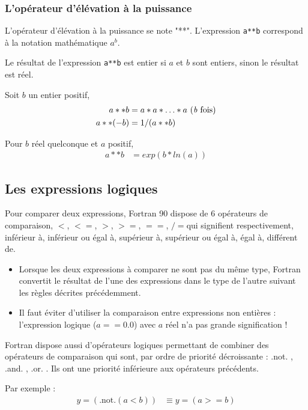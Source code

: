 \documentclass[a4paper,twoside]{article}
\begin{document}
\subsubsection{L'opérateur d'élévation à la puissance}

L'opérateur d'élévation à la puissance se note "**". L'expression \texttt{a**b} correspond à la notation mathé\-ma\-tique $a^{b}$. 

Le résultat de l'expression \texttt{a**b} est entier si $a$ et $b$ sont entiers, sinon le résultat est réel.

Soit $b$ un entier positif, 
\begin{align}
a**b &= a*a*\ldots*a \text{ (\emph{b} fois)}\\
a**(-b) &= 1/(a**b)
\end{align}

Pour $b$ réel quelconque et $a$ positif,
\begin{align}
a**b &= exp(b*ln(a))
\end{align}

\subsection{Les expressions logiques}
Pour comparer deux expressions, Fortran 90 dispose de 6 opérateurs de comparaison, \og $<$\fg, \og $<=$\fg, \og $>$\fg, \og $>=$\fg, \og $==$\fg, \og $/=$\fg qui signifient respectivement, inférieur à, inférieur ou égal à, supérieur à, supérieur ou égal à, égal à, différent de. 

\begin{itemize}
\item Lorsque les deux expressions à comparer ne sont pas du même type, Fortran convertit le résultat de l'une des expressions dans le type de l'autre suivant les règles décrites précédemment.

\item Il faut éviter d'utiliser la comparaison entre expressions non 
entières : l'expression logique ($a == 0.0$) avec $a$ réel n'a pas grande 
signification ! 
\end{itemize}

Fortran dispose aussi d'opérateurs logiques permettant de 
combiner des opérateurs de compa\-rai\-son qui sont, par ordre de 
priorité décroissante : \og .not. \fg, \og .and. \fg, \og .or. \fg. Ils ont une 
priorité inférieure aux opérateurs précédents. 

Par exemple :
\begin{align}
y = (\mbox{.not.}(a<b)) &\equiv y = (a>=b) 
\end{align}
\end{document}
